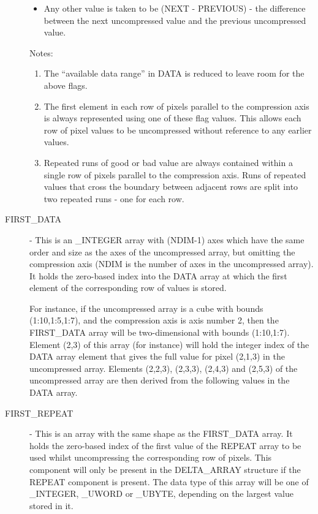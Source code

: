 \documentclass[twoside,11pt,nolof]{starlink}
\begin{document}
\begin{description}
\begin{itemize}
\item Any other value is taken to be (NEXT - PREVIOUS) - the difference
between the next uncompressed value and the previous uncompressed value.

\end{itemize}

Notes:

\begin{enumerate}

\item The ``available data range'' in DATA is reduced to leave room for the
above flags.

\item The first element in each row of pixels parallel to the compression
axis is always represented using one of these flag values. This allows
each row of pixel values to be uncompressed without reference to any
earlier values.

\item Repeated runs of good or bad value are always contained within a single
row of pixels parallel to the compression axis. Runs of repeated values
that cross the boundary between adjacent rows are split into two repeated
runs - one for each row.

\end{enumerate}

\item[FIRST\_DATA] - This is an \_INTEGER array with (NDIM-1) axes which
have the same order and size as the axes of the uncompressed array, but
omitting the compression axis (NDIM is the number of axes in the
uncompressed array). It holds the zero-based index into the DATA array at
which the first element of the corresponding row of values is stored.

For instance, if the uncompressed array is a cube with bounds
(1:10,1:5,1:7), and the compression axis is axis number 2, then the
FIRST\_DATA array will be two-dimensional with bounds (1:10,1:7). Element
(2,3) of this array (for instance) will hold the integer index of the
DATA array element that gives the full value for pixel (2,1,3) in the
uncompressed array. Elements (2,2,3), (2,3,3), (2,4,3) and (2,5,3) of the
uncompressed array are then derived from the following values in the DATA
array.

\item[FIRST\_REPEAT] - This is an array with the same shape as
the FIRST\_DATA array. It holds the zero-based index of the first value
of the REPEAT array to be used whilst uncompressing the corresponding
row of pixels. This component will only be present in the DELTA\_ARRAY
structure if the REPEAT component is present. The data type of this array
will be one of \_INTEGER, \_UWORD or \_UBYTE, depending on the largest value
stored in it.


\end{description}
\end{document}
